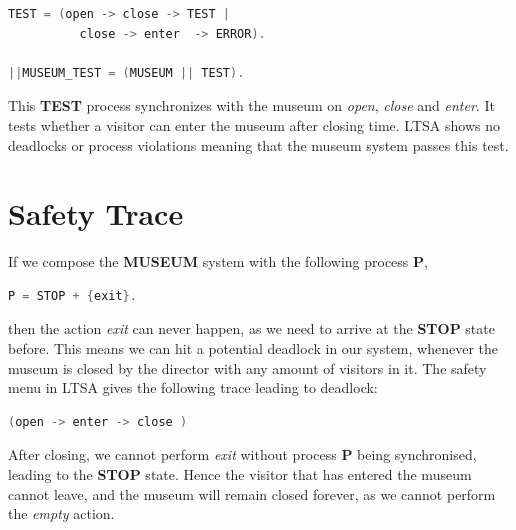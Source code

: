 \documentclass[11pt]{article} %
\begin{document}
\begin{lstlisting}[language=Java]
TEST = (open -> close -> TEST |
	      close -> enter  -> ERROR).

||MUSEUM_TEST = (MUSEUM || TEST).
\end{lstlisting}

This \textbf{TEST} process synchronizes with the museum on \textit{open}, \textit{close} and \textit{enter}. It tests whether a visitor can enter the museum after closing time. LTSA shows no deadlocks or process violations meaning that the museum system passes this test.



\pagebreak
\section{Safety Trace}
If we compose the \textbf{MUSEUM} system with the following process \textbf{P},

\begin{lstlisting}[language=Java]
P = STOP + {exit}.
\end{lstlisting}

then the action \textit{exit} can never happen, as we need to arrive at the \textbf{STOP} state before. This means we can hit a potential deadlock in our system, whenever the museum is closed by the director with any amount of visitors in it. The safety menu in LTSA gives the following trace leading to deadlock:

\begin{lstlisting}[language=Java]
(open -> enter -> close )
\end{lstlisting}

After closing, we cannot perform \textit{exit} without process \textbf{P} being synchronised, leading to the \textbf{STOP} state. Hence the visitor that has entered the museum cannot leave, and the museum will remain closed forever, as we cannot perform the \textit{empty} action.
\end{document}
